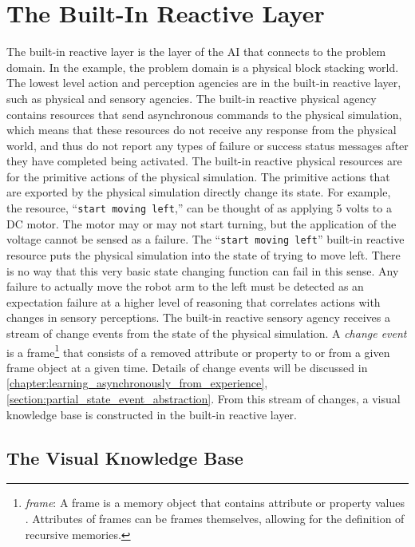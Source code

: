 \section{The Built-In Reactive Layer}

The built-in reactive layer is the layer of the AI that connects to
the problem domain.  In the example, the problem domain is a physical
block stacking world.  The lowest level action and perception agencies
are in the built-in reactive layer, such as physical and sensory
agencies.  The built-in reactive physical agency contains resources
that send asynchronous commands to the physical simulation, which
means that these resources do not receive any response from the
physical world, and thus do not report any types of failure or success
status messages after they have completed being activated.  The
built-in reactive physical resources are for the primitive actions of
the physical simulation.  The primitive actions that are exported by
the physical simulation directly change its state.  For example, the
resource, ``{\tt{start moving left}},'' can be thought of as applying
5 volts to a DC motor.  The motor may or may not start turning, but
the application of the voltage cannot be sensed as a failure.  The
``{\tt{start moving left}}'' built-in reactive resource puts the
physical simulation into the state of trying to move left.  There is
no way that this very basic state changing function can fail in this
sense.  Any failure to actually move the robot arm to the left must be
detected as an expectation failure at a higher level of reasoning that
correlates actions with changes in sensory perceptions.  The built-in
reactive sensory agency receives a stream of change events from the
state of the physical simulation.  A {\emph{change event}} is a
frame\footnote{\emph{frame}: A frame is a memory object that contains
  attribute or property values \cite[]{minsky:1975}.  Attributes of
  frames can be frames themselves, allowing for the definition of
  recursive memories.} that consists of a removed attribute or
property to or from a given frame object at a given time.  Details of
change events will be discussed in
{\mbox{\autoref{chapter:learning_asynchronously_from_experience}}},
{\mbox{\autoref{section:partial_state_event_abstraction}}}.  From this
stream of changes, a visual knowledge base is constructed in the
built-in reactive layer.

\subsection{The Visual Knowledge Base}

